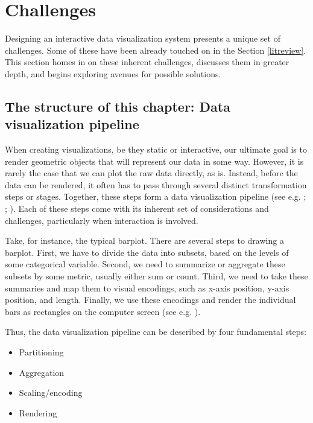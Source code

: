 \documentclass[
]{book}
\providecommand{\tightlist}{%
  \setlength{\itemsep}{0pt}\setlength{\parskip}{0pt}}
\theoremstyle{definition}
\theoremstyle{definition}
\theoremstyle{definition}
\theoremstyle{definition}
\theoremstyle{remark}
\begin{document}
\newcommand\thena{⨾}

\chapter{Challenges}\label{problems}

Designing an interactive data visualization system presents a unique set of challenges. Some of these have been already touched on in the Section \ref{litreview}. This section homes in on these inherent challenges, discusses them in greater depth, and begins exploring avenues for possible solutions.

\section{The structure of this chapter: Data visualization pipeline}\label{the-structure-of-this-chapter-data-visualization-pipeline}

When creating visualizations, be they static or interactive, our ultimate goal is to render geometric objects that will represent our data in some way. However, it is rarely the case that we can plot the raw data directly, as is. Instead, before the data can be rendered, it often has to pass through several distinct transformation steps or stages. Together, these steps form a data visualization pipeline (see e.g. ; ; ). Each of these steps come with its inherent set of considerations and challenges, particularly when interaction is involved.

Take, for instance, the typical barplot. There are several steps to drawing a barplot. First, we have to divide the data into subsets, based on the levels of some categorical variable. Second, we need to summarize or aggregate these subsets by some metric, usually either sum or count. Third, we need to take these summaries and map them to visual encodings, such as x-axis position, y-axis position, and length. Finally, we use these encodings and render the individual bars as rectangles on the computer screen (see e.g. ).

Thus, the data visualization pipeline can be described by four fundamental steps:

\begin{itemize}
\tightlist
\item
  Partitioning
\item
  Aggregation
\item
  Scaling/encoding
\item
  Rendering
\end{itemize}
\end{document}
